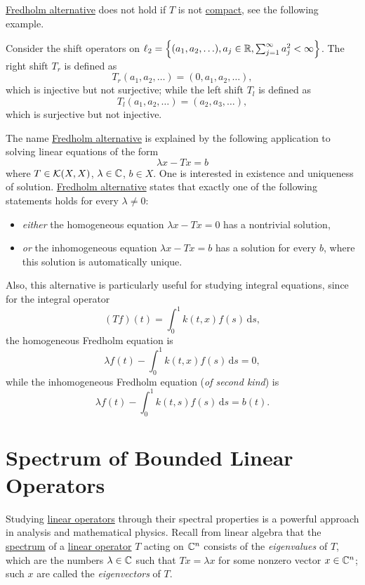 \hyperref[thm:Fredholm-alternative]{Fredholm alternative} does not hold if \(T\) is not \hyperref[def:compact-op]{compact}, see the following example.
\begin{eg}
	Consider the shift operators on \(\ell _2 = \left\{ (a_1, a_2, \ldots ), a_j\in \mathbb{\MakeUppercase{r}}, \sum_{j=1}^{\infty}  a_j^2 < \infty \right\} \). The right shift \(T_r\) is defined as
	\[
		T_r(a_1, a_2, \ldots) = (0, a_1, a_2, \ldots ),
	\]
	which is injective but not surjective; while the left shift \(T_l\) is defined as
	\[
		T_l(a_1, a_2, \ldots ) = (a_2, a_3, \ldots ),
	\]
	which is surjective but not injective.
\end{eg}

The name \hyperref[thm:Fredholm-alternative]{Fredholm alternative} is explained by the following application to solving linear equations of the form
\[
	\lambda x - Tx = b
\]
where \(T\in \mathcal{\MakeUppercase{k}} (X, X)\), \(\lambda \in \mathbb{\MakeUppercase{c}} \), \(b\in X\). One is interested in existence and uniqueness of solution. \hyperref[thm:Fredholm-alternative]{Fredholm alternative} states that exactly one of the following statements holds for every \(\lambda \neq 0\):
\begin{itemize}
	\item \emph{either} the homogeneous equation \(\lambda x - Tx = 0\) has a nontrivial solution,
	\item \emph{or} the inhomogeneous equation \(\lambda x - Tx = b\) has a solution for every \(b\), where this solution is automatically unique.
\end{itemize}

Also, this alternative is particularly useful for studying integral equations, since for the integral operator
\[
	(Tf)(t) = \int_{0}^{1} k(t, x)f(s) \,\mathrm{d}s ,
\]
the homogeneous Fredholm equation is
\[
	\lambda f(t) - \int_{0}^{1} k(t, x)f(s) \,\mathrm{d}s = 0,
\]
while the inhomogeneous Fredholm equation (\emph{of second kind}) is
\[
	\lambda f(t) - \int_{0}^{1} k(t, s) f(s) \,\mathrm{d}s = b(t).
\]

\section{Spectrum of Bounded Linear Operators}
Studying \hyperref[def:linear-op]{linear operators} through their spectral properties is a powerful approach in analysis and mathematical physics. Recall from linear algebra that the \hyperref[def:spectrum-point]{spectrum} of a \hyperref[def:linear-op]{linear operator} \(T\) acting on \(\mathbb{\MakeUppercase{c}} ^n\) consists of the \emph{eigenvalues} of \(T\), which are the numbers \(\lambda \in \mathbb{\MakeUppercase{c}} \) such that \(Tx = \lambda x\) for some nonzero vector \(x\in \mathbb{\MakeUppercase{c}} ^n\); such \(x\) are called the \emph{eigenvectors} of \(T\).

